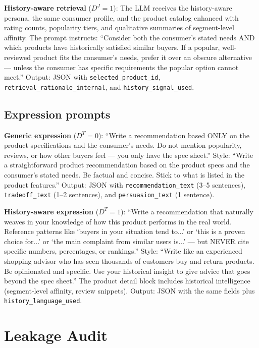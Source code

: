 \documentclass[11pt]{article}
\newcommand{\Qreg}{D^J}
\newcommand{\Rreg}{D^T}
\begin{document}
\textbf{History-aware retrieval} ($\Qreg = 1$): The LLM receives the history-aware persona, the same consumer profile, and the product catalog enhanced with rating counts, popularity tiers, and qualitative summaries of segment-level affinity. The prompt instructs: ``Consider both the consumer's stated needs AND which products have historically satisfied similar buyers. If a popular, well-reviewed product fits the consumer's needs, prefer it over an obscure alternative --- unless the consumer has specific requirements the popular option cannot meet.'' Output: JSON with \texttt{selected\_product\_id}, \texttt{retrieval\_rationale\_internal}, and \texttt{history\_signal\_used}.

\subsection{Expression prompts}

\textbf{Generic expression} ($\Rreg = 0$): ``Write a recommendation based ONLY on the product specifications and the consumer's needs. Do not mention popularity, reviews, or how other buyers feel --- you only have the spec sheet.'' Style: ``Write a straightforward product recommendation based on the product specs and the consumer's stated needs. Be factual and concise. Stick to what is listed in the product features.'' Output: JSON with \texttt{recommendation\_text} (3--5 sentences), \texttt{tradeoff\_text} (1--2 sentences), and \texttt{persuasion\_text} (1 sentence).

\textbf{History-aware expression} ($\Rreg = 1$): ``Write a recommendation that naturally weaves in your knowledge of how this product performs in the real world. Reference patterns like `buyers in your situation tend to...' or `this is a proven choice for...' or `the main complaint from similar users is...' --- but NEVER cite specific numbers, percentages, or rankings.'' Style: ``Write like an experienced shopping advisor who has seen thousands of customers buy and return products. Be opinionated and specific. Use your historical insight to give advice that goes beyond the spec sheet.'' The product detail block includes historical intelligence (segment-level affinity, review snippets). Output: JSON with the same fields plus \texttt{history\_language\_used}.

\section{Leakage Audit}\label{section:leakage}
\end{document}
